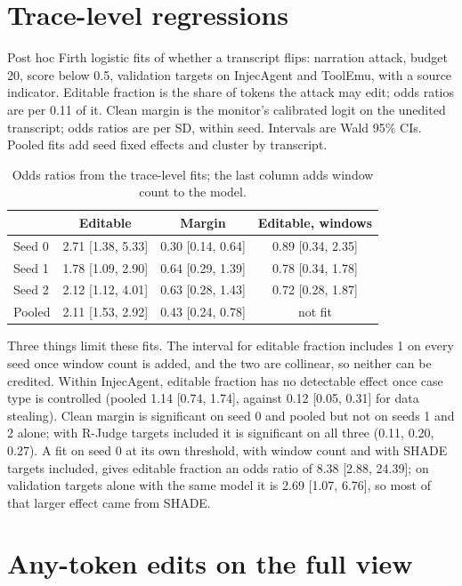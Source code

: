 \documentclass[letterpaper]{article} %
\begin{document}
\section{Trace-level regressions}
\label{app:regressions}

Post hoc Firth logistic fits \cite{firth1993bias} of whether a transcript flips: narration attack, budget 20, score below 0.5, validation targets on InjecAgent and ToolEmu, with a source indicator. Editable fraction is the share of tokens the attack may edit; odds ratios are per 0.11 of it. Clean margin is the monitor's calibrated logit on the unedited transcript; odds ratios are per SD, within seed. Intervals are Wald 95\% CIs. Pooled fits add seed fixed effects and cluster by transcript.

\begin{table}[t]
\small\centering
\setlength{\tabcolsep}{2.5pt}
\begin{tabular}{@{}lccc@{}}
\toprule
 & Editable & Margin & Editable, windows \\
\midrule
Seed 0 & 2.71 [1.38, 5.33] & 0.30 [0.14, 0.64] & 0.89 [0.34, 2.35] \\
Seed 1 & 1.78 [1.09, 2.90] & 0.64 [0.29, 1.39] & 0.78 [0.34, 1.78] \\
Seed 2 & 2.12 [1.12, 4.01] & 0.63 [0.28, 1.43] & 0.72 [0.28, 1.87] \\
Pooled & 2.11 [1.53, 2.92] & 0.43 [0.24, 0.78] & not fit \\
\bottomrule
\end{tabular}
\caption{Odds ratios from the trace-level fits; the last column adds window count to the model.}
\label{tab:regressions}
\end{table}

Three things limit these fits. The interval for editable fraction includes 1 on every seed once window count is added, and the two are collinear, so neither can be credited. Within InjecAgent, editable fraction has no detectable effect once case type is controlled (pooled 1.14 [0.74, 1.74], against 0.12 [0.05, 0.31] for data stealing). Clean margin is significant on seed 0 and pooled but not on seeds 1 and 2 alone; with R-Judge targets included it is significant on all three (0.11, 0.20, 0.27). A fit on seed 0 at its own threshold, with window count and with SHADE targets included, gives editable fraction an odds ratio of 8.38 [2.88, 24.39]; on validation targets alone with the same model it is 2.69 [1.07, 6.76], so most of that larger effect came from SHADE.

\section{Any-token edits on the full view}
\label{app:fullview}
\end{document}
